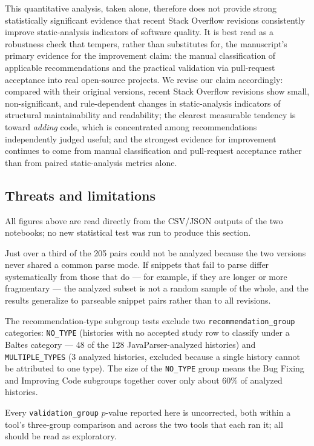 This quantitative analysis, taken alone, therefore does not provide strong statistically significant evidence that recent Stack Overflow revisions consistently improve static-analysis indicators of software quality.
It is best read as a robustness check that tempers, rather than substitutes for, the manuscript's primary evidence for the improvement claim: the manual classification of applicable recommendations and the practical validation via pull-request acceptance into real open-source projects.
We revise our claim accordingly: compared with their original versions, recent Stack Overflow revisions show small, non-significant, and rule-dependent changes in static-analysis indicators of structural maintainability and readability; the clearest measurable tendency is toward \emph{adding} code, which is concentrated among recommendations independently judged useful; and the strongest evidence for improvement continues to come from manual classification and pull-request acceptance rather than from paired static-analysis metrics alone.

\subsection{Threats and limitations}
\label{sec:or-limitations}

All figures above are read directly from the CSV/JSON outputs of the two notebooks; no new statistical test was run to produce this section.

Just over a third of the 205 pairs could not be analyzed because the two versions never shared a common parse mode.
If snippets that fail to parse differ systematically from those that do --- for example, if they are longer or more fragmentary --- the analyzed subset is not a random sample of the whole, and the results generalize to parseable snippet pairs rather than to all revisions.

The recommendation-type subgroup tests exclude two \texttt{recommendation\_group} categories: \texttt{NO\_TYPE} (histories with no accepted study row to classify under a Baltes category --- 48 of the 128 JavaParser-analyzed histories) and \texttt{MULTIPLE\_TYPES} (3 analyzed histories, excluded because a single history cannot be attributed to one type).
The size of the \texttt{NO\_TYPE} group means the Bug Fixing and Improving Code subgroups together cover only about 60\% of analyzed histories.

Every \texttt{validation\_group} $p$-value reported here is uncorrected, both within a tool's three-group comparison and across the two tools that each ran it; all should be read as exploratory.

